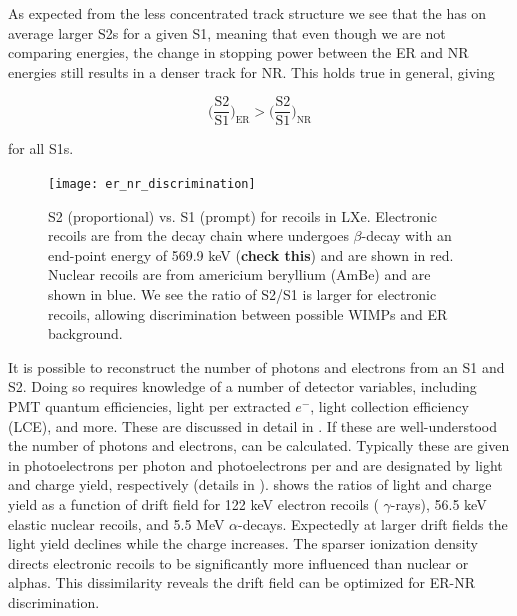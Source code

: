 As expected from the less concentrated track structure we see that the 
has on average larger S2s for a given S1, meaning that even though we are not comparing energies, the change in stopping
power between the ER and NR energies still results in a denser track for NR.  This holds true in general, giving

\begin{equation}
\Big( \frac{\mathrm{S}2}{\mathrm{S}1} \Big)_{\mathrm{ER}} > \Big( \frac{\mathrm{S}2}{\mathrm{S}1} \Big)_{\mathrm{NR}}
\end{equation}

\noindent for all S1s.

\begin{figure}
\centering
\texttt{[image: er\_nr\_discrimination]}
\caption{S2 (proportional) vs. S1 (prompt) for recoils in LXe.  Electronic recoils are from the  decay chain where
 undergoes $\beta$-decay with an end-point energy of 569.9 keV (\textbf{check this}) and are shown in red.  Nuclear
recoils are from americium beryllium (AmBe) and are shown in blue.  We see the ratio of S2/S1 is larger for electronic recoils,
allowing discrimination between possible WIMPs and ER background.}
\label{fig:tpcs_signals_ernr}
\end{figure}

It is possible to reconstruct the number of photons and electrons from an S1 and S2.  Doing so requires knowledge of a number of detector
variables, including PMT quantum efficiencies, light per extracted $e^{-}$, light collection efficiency (LCE), and more.  These are
discussed in detail in .  If these are well-understood the number of photons and electrons,
can be calculated.  Typically these are given in photoelectrons per photon and photoelectrons per \electron and are designated by
light and charge yield, respectively (details in \secref{}).   shows the ratios of light and
charge yield as a function of drift field for 122 keV electron recoils ( $\gamma$-rays), 56.5 keV elastic nuclear recoils, and
5.5 MeV $\alpha$-decays.  Expectedly at larger drift fields the light yield declines while the charge increases.  The sparser
ionization density directs electronic recoils to be significantly more influenced than nuclear or alphas.  This dissimilarity reveals
the drift field can be optimized for ER-NR discrimination.

